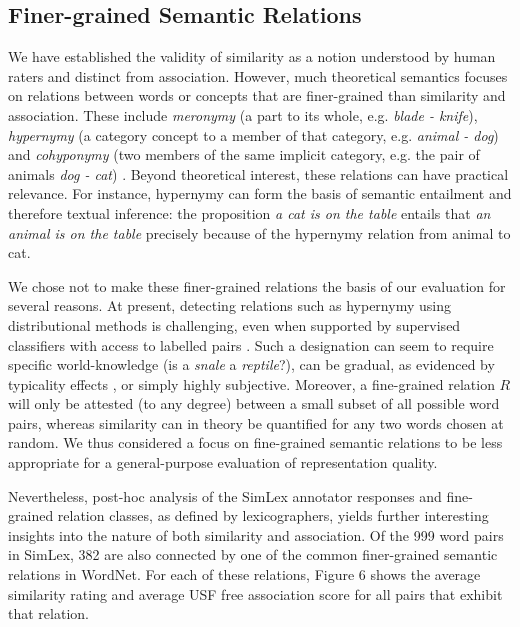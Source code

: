 \subsection{Finer-grained Semantic Relations}

We have established the validity of similarity as a notion understood by human raters and distinct from association. However, much theoretical semantics focuses on relations between words or concepts that are finer-grained than similarity and association. These include \emph{meronymy} (a part to its whole, e.g. \emph{blade - knife}), \emph{hypernymy} (a category concept to a member of that category, e.g. \emph{animal - dog}) and \emph{cohyponymy} (two members of the same implicit category, e.g. the pair of animals \emph{dog - cat}) \cite{cruse1986lexical}. Beyond theoretical interest, these relations can have practical relevance. For instance, hypernymy can form the basis of semantic entailment and therefore textual inference: the proposition \emph{a cat is on the table} entails that \emph{an animal is on the table} precisely because of the hypernymy relation from animal to cat. 

We chose not to make these finer-grained relations the basis of our evaluation for several reasons. At present, detecting relations such as hypernymy using distributional methods is challenging, even when supported by supervised classifiers with access to labelled pairs \cite{levy2015supervised}. Such a designation can seem to require specific world-knowledge (is a \emph{snale} a \emph{reptile}?), can be gradual, as evidenced by typicality effects \cite{rosch1976structural}, or simply highly subjective. Moreover, a fine-grained relation \(R\) will only be attested (to any degree) between a small subset of all possible word pairs, whereas similarity can in theory be quantified for any two words chosen at random. We thus considered a focus on fine-grained semantic relations to be less appropriate for a general-purpose evaluation of representation quality.  

Nevertheless, post-hoc analysis of the SimLex annotator responses and fine-grained relation classes, as defined by lexicographers, yields further interesting insights into the nature of both similarity and association. Of the 999 word pairs in SimLex, 382 are also connected by one of the common finer-grained semantic relations in WordNet. For each of these relations, Figure 6 shows the average similarity rating and average USF free association score for all pairs that exhibit that relation. 

